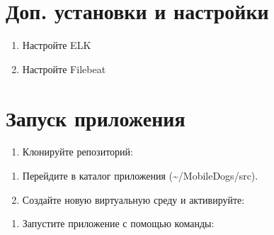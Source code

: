 \documentclass[letterpaper,10pt,russian]{sphinxmanual}
\begin{document}
\section{Доп. установки и настройки}
\label{\detokenize{README:id6}}\begin{enumerate}
%
\item {} 
\sphinxAtStartPar
Настройте ELK

\item {} 
\sphinxAtStartPar
Настройте Filebeat

\end{enumerate}


\section{Запуск приложения}
\label{\detokenize{README:id7}}\begin{enumerate}
%
\item {} 
\sphinxAtStartPar
Клонируйте репозиторий:

\end{enumerate}

\begin{sphinxVerbatim}[commandchars=\\\{\}]
  
   
  
\end{sphinxVerbatim}
\begin{enumerate}
%
\setcounter{enumi}{1}
\item {} 
\sphinxAtStartPar
Перейдите в каталог приложения (\textasciitilde{}/MobileDogs/src).

\item {} 
\sphinxAtStartPar
Создайте новую виртуальную среду и активируйте:

\end{enumerate}

\begin{sphinxVerbatim}[commandchars=\\\{\}]
   
 
\end{sphinxVerbatim}
\begin{enumerate}
%
\setcounter{enumi}{3}
\item {} 
\sphinxAtStartPar
Запустите приложение с помощью команды:

\end{enumerate}
\end{document}
